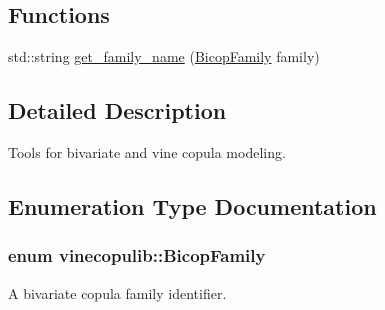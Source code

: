 \subsection*{Functions}
\begin{DoxyCompactItemize}
\item 
std\+::string \hyperlink{namespacevinecopulib_ac46553ae5f99072f65e9d3254d2c526d}{get\+\_\+family\+\_\+name} (\hyperlink{namespacevinecopulib_a42e95cc06d33896199caab0c11ad44f3}{Bicop\+Family} family)
\end{DoxyCompactItemize}


\subsection{Detailed Description}
Tools for bivariate and vine copula modeling. 

\subsection{Enumeration Type Documentation}
\subsubsection[{\texorpdfstring{Bicop\+Family}{BicopFamily}}]{\setlength{\rightskip}{0pt plus 5cm}enum {\bf vinecopulib\+::\+Bicop\+Family}\hspace{0.3cm}{\ttfamily [strong]}}\hypertarget{namespacevinecopulib_a42e95cc06d33896199caab0c11ad44f3}{}\label{namespacevinecopulib_a42e95cc06d33896199caab0c11ad44f3}


A bivariate copula family identifier. 


